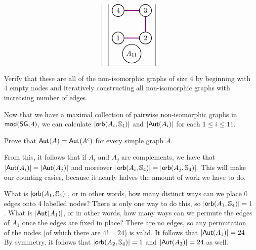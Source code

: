 \[\begin{array}{|l|l|l|}
\begin{tikzpicture}
\begin{scope}[%
              every node/.style={fill=white,circle},
              every edge/.style={draw=blue,very thick}]
\end{scope}
\end{tikzpicture}
&
\begin{tikzpicture}
[scale=.2]
\begin{scope}[every node/.style={circle,thick,draw}]
    \node (1) at (0,4) {1};
    \node (2) at (7,4) {2};
    \node (3) at (7,11) {3};
    \node (4) at (0,11) {4};
   \node(A) at (3.5,0) {$A_{11}$};
\end{scope}

\begin{scope}[%
              every node/.style={fill=white,circle},
              every edge/.style={draw=violet,very thick}]
 \draw (1) edge  (2);
     \draw (2) edge  (3);
     \draw (3) edge  (4);
     \end{scope}
\end{tikzpicture}
\\
\hline

\end{array}
\]

\begin{aside}
    Verify that these are all of the non-isomorphic graphs of size 4 by beginning with 4 empty nodes and iteratively constructing all non-isomorphic graphs with increasing number of edges. 
\end{aside}

Now that we have a maximal collection of pairwise non-isomorphic graphs in $\mbox{$\mathsf {mod}(\mbox{$\mathsf{SG}$},4)$}$, we can calculate $\mbox{$|\mbox{$\mathsf{orb}(A_i,\mbox{$\mathbb{S}_{4}$})$}|$}$ and $\mbox{$|\mbox{$\mathsf{Aut}(A_i)$}|$}$ for each $1\leq i\leq 11$. 

\begin{aside}
    Prove that $\mbox{$\mathsf{Aut}(A)$} = \mbox{$\mathsf{Aut}(A^c)$}$ for every simple graph $A$. 

    From this, it follows that if $A_i$ and $A_j$ are complements, we have that $\mbox{$|\mbox{$\mathsf{Aut}(A_i)$}|$} = \mbox{$|\mbox{$\mathsf{Aut}(A_j)$}|$}$ and moreover $\mbox{$|\mbox{$\mathsf{orb}(A_i,\mbox{$\mathbb{S}_{4}$})$}|$} = \mbox{$|\mbox{$\mathsf{orb}(A_j,\mbox{$\mathbb{S}_{4}$})$}|$}$. This will make our counting easier, because it nearly halves the amount of work we have to do. 
\end{aside}

What is $\mbox{$|\mbox{$\mathsf{orb}(A_1,\mbox{$\mathbb{S}_{4}$})$}|$}$, or in other words, how many distinct ways can we place 0 edges onto 4 labelled nodes? There is only one way to do this, so $\mbox{$|\mbox{$\mathsf{orb}(A_1,\mbox{$\mathbb{S}_{4}$})$}|$} = 1$. What is $\mbox{$|\mbox{$\mathsf{Aut}(A_1)$}|$}$, or in other words, how many ways can we permute the edges of $A_1$ once the edges are fixed in place? There are no edges, so any permutation of the nodes (of which there are $4! = 24$) is valid. It follows that $\mbox{$|\mbox{$\mathsf{Aut}(A_1)$}|$} = 24$. By symmetry, it follows that $\mbox{$|\mbox{$\mathsf{orb}(A_2,\mbox{$\mathbb{S}_{4}$})$}|$} = 1$ and $\mbox{$|\mbox{$\mathsf{Aut}(A_2)$}|$} = 24$ as well. 


